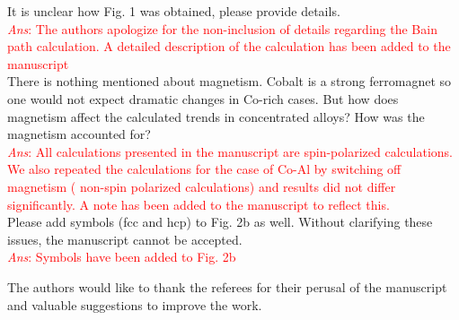 \documentclass[letterpaper,10pt, notitlepage, leqno]{article}
\begin{document}
It is unclear how Fig. 1 was obtained, please provide details. \\
\textcolor{red}{\textit{Ans}: The authors apologize for the non-inclusion of details regarding the Bain path calculation. A detailed description of the calculation has been added to the manuscript} \\

There is nothing mentioned about magnetism. Cobalt is a strong ferromagnet so one would not expect dramatic changes in Co-rich cases. But how does magnetism affect the calculated trends in concentrated alloys? How was the magnetism accounted for? \\
\textcolor{red}{\textit{Ans}: All calculations presented in the manuscript are spin-polarized calculations. We also repeated the calculations for the case of Co-Al by switching off magnetism ( non-spin polarized calculations) and results did not differ significantly. A note has been added to the manuscript to reflect this.} \\
Please add symbols (fcc and hcp) to Fig. 2b as well. Without clarifying these issues, the manuscript cannot be accepted.\\
\textcolor{red}{\textit{Ans}: Symbols have been added to Fig. 2b} 

The authors would like to thank the referees for their perusal of the manuscript and valuable suggestions to improve the work.
\end{document}
